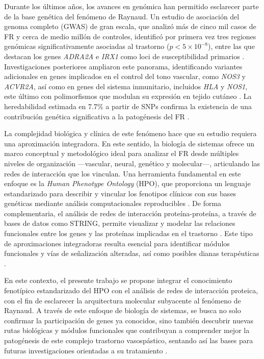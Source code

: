 Durante los últimos años, los avances en genómica han permitido esclarecer parte de la base genética del fenómeno de Raynaud. Un estudio de asociación del genoma completo (GWAS) de gran escala, que analizó más de cinco mil casos de FR y cerca de medio millón de controles, identificó por primera vez tres regiones genómicas significativamente asociadas al trastorno ($p < 5 \times 10^{-8}$), entre las que destacan los genes \textit{ADRA2A} e \textit{IRX1} como loci de susceptibilidad primarios \cite{Hartmann2023}. Investigaciones posteriores ampliaron este panorama, identificando variantes adicionales en genes implicados en el control del tono vascular, como \textit{NOS3} y \textit{ACVR2A}, así como en genes del sistema inmunitario, incluidos \textit{HLA} y \textit{NOS1}, este último con polimorfismos que modulan su expresión en tejido cutáneo \cite{deAlmeidaTervi2024, Smolina2018, Hughes2017}. La heredabilidad estimada en 7.7\% a partir de SNPs confirma la existencia de una contribución genética significativa a la patogénesis del FR \cite{Hartmann2023, ofLondon2023}.  

La complejidad biológica y clínica de este fenómeno hace que su estudio requiera una aproximación integradora. En este sentido, la biología de sistemas ofrece un marco conceptual y metodológico ideal para analizar el FR desde múltiples niveles de organización —vascular, neural, genético y molecular—, articulando las redes de interacción que los vinculan. Una herramienta fundamental en este enfoque es la \textit{Human Phenotype Ontology} (HPO), que proporciona un lenguaje estandarizado para describir y vincular los fenotipos clínicos con sus bases genéticas mediante análisis computacionales reproducibles \cite{Khler2021, Robinson2008, Groza2023}. De forma complementaria, el análisis de redes de interacción proteína-proteína, a través de bases de datos como STRING, permite visualizar y modelar las relaciones funcionales entre los genes y las proteínas implicadas en el trastorno \cite{Szklarczyk2025, Orchard2014}. Este tipo de aproximaciones integradoras resulta esencial para identificar módulos funcionales y vías de señalización alteradas, así como posibles dianas terapéuticas \cite{Consortium2021, Naylor2010, Fischer2025, Ideker2011}.  

En este contexto, el presente trabajo se propone integrar el conocimiento fenotípico estandarizado del HPO con el análisis de redes de interacción proteica, con el fin de esclarecer la arquitectura molecular subyacente al fenómeno de Raynaud. A través de este enfoque de biología de sistemas, se busca no solo confirmar la participación de genes ya conocidos, sino también descubrir nuevas rutas biológicas y módulos funcionales que contribuyan a comprender mejor la patogénesis de este complejo trastorno vasospástico, sentando así las bases para futuras investigaciones orientadas a su tratamiento \cite{Naylor2010, Fischer2025, Barabsi2011}.